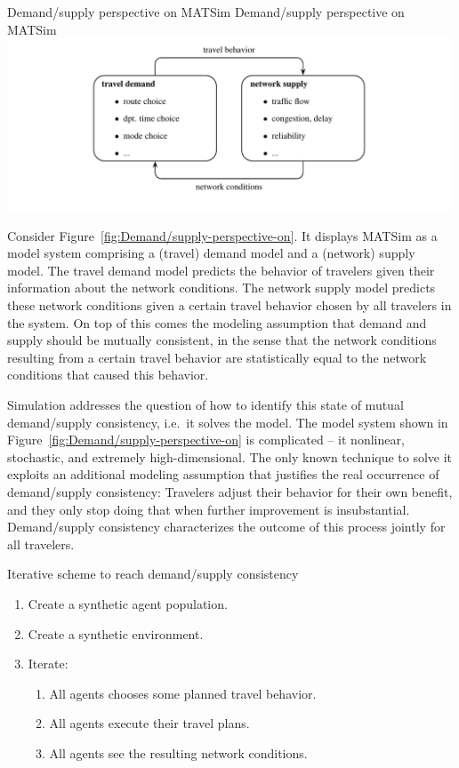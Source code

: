 \createfigure%
{Demand/supply perspective on MATSim}%
{Demand/supply perspective on MATSim}%
{\label{fig:Demand/supply-perspective-on}}%
{\includegraphics[width=0.99\textwidth, angle=0]{understanding/figures/mc/fig0.pdf}}%
{}

Consider Figure~\ref{fig:Demand/supply-perspective-on}. It displays
MATSim as a model system comprising a (travel) demand model and a
(network) supply model. The travel demand model predicts the behavior
of travelers given their information about the network conditions.
The network supply model predicts these network conditions given a
certain travel behavior chosen by all travelers in the system. On
top of this comes the modeling assumption that demand and supply should
be mutually consistent, in the sense that the network conditions resulting
from a certain travel behavior are statistically equal to the network
conditions that caused this behavior.

Simulation addresses the question of how to identify this state of
mutual demand/supply consistency, i.e.\ it solves the model. The model
system shown in Figure~\ref{fig:Demand/supply-perspective-on} is
complicated -- it nonlinear, stochastic, and extremely high-dimensional.
The only known technique to solve it exploits an additional modeling
assumption that justifies the real occurrence of demand/supply consistency:
Travelers adjust their behavior for their own benefit, and they only
stop doing that when further improvement is insubstantial. Demand/supply
consistency characterizes the outcome of this process jointly for
all travelers.

\begin{algorithm}
\caption{\label{alg:Iterative-scheme-to}Iterative scheme to reach demand/supply
consistency}

\begin{enumerate}
\item Create a synthetic agent population.
\item Create a synthetic environment.
\item Iterate:

\begin{enumerate}
\item All agents chooses some planned travel behavior.
\item All agents execute their travel plans.
\item All agents see the resulting network conditions.\end{enumerate}
\end{enumerate}
\end{algorithm}


